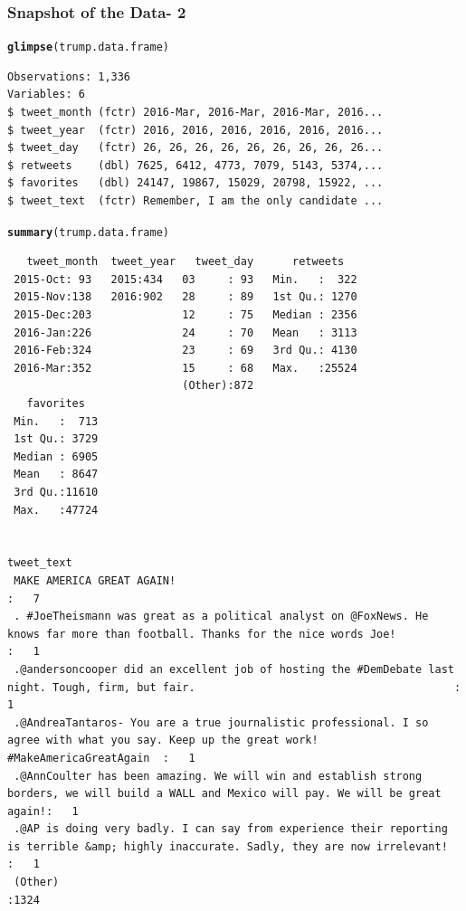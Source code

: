 \documentclass{beamer}\usepackage[]{graphicx}\usepackage[]{color}
\makeatletter
\newcommand{\hlstd}[1]{\textcolor[rgb]{0.102,0.102,0.102}{#1}}%
\newcommand{\hlkwd}[1]{\textcolor[rgb]{0.102,0.102,0.102}{\textbf{#1}}}%
\newenvironment{kframe}{%
 \def\at@end@of@kframe{}%
 \ifinner\ifhmode%
  \def\at@end@of@kframe{\end{minipage}}%
  \begin{minipage}{\columnwidth}%
 \fi\fi%
 \def\FrameCommand##1{\hskip\@totalleftmargin \hskip-\fboxsep
 \colorbox{shadecolor}{##1}\hskip-\fboxsep
     \hskip-\linewidth \hskip-\@totalleftmargin \hskip\columnwidth}%
 \MakeFramed {\advance\hsize-\width
   \@totalleftmargin\z@ \linewidth\hsize
   \@setminipage}}%
 {\par\unskip\endMakeFramed%
 \at@end@of@kframe}
\newenvironment{knitrout}{}{} %
\renewenvironment{knitrout}{\begin{spacing}{0.75}\begin{tiny}}{\end{tiny}\end{spacing}}
\makeatother
\begin{document}
\begin{frame}[fragile]
\frametitle{Snapshot of the Data- 2}

\begin{knitrout}\small
{}\color{fgcolor}\begin{kframe}
\begin{alltt}
\hlkwd{glimpse}\hlstd{(trump.data.frame)}
\end{alltt}
\begin{verbatim}
Observations: 1,336
Variables: 6
$ tweet_month (fctr) 2016-Mar, 2016-Mar, 2016-Mar, 2016...
$ tweet_year  (fctr) 2016, 2016, 2016, 2016, 2016, 2016...
$ tweet_day   (fctr) 26, 26, 26, 26, 26, 26, 26, 26, 26...
$ retweets    (dbl) 7625, 6412, 4773, 7079, 5143, 5374,...
$ favorites   (dbl) 24147, 19867, 15029, 20798, 15922, ...
$ tweet_text  (fctr) Remember, I am the only candidate ...
\end{verbatim}
\begin{alltt}
\hlkwd{summary}\hlstd{(trump.data.frame)}
\end{alltt}
\begin{verbatim}
   tweet_month  tweet_year   tweet_day      retweets    
 2015-Oct: 93   2015:434   03     : 93   Min.   :  322  
 2015-Nov:138   2016:902   28     : 89   1st Qu.: 1270  
 2015-Dec:203              12     : 75   Median : 2356  
 2016-Jan:226              24     : 70   Mean   : 3113  
 2016-Feb:324              23     : 69   3rd Qu.: 4130  
 2016-Mar:352              15     : 68   Max.   :25524  
                           (Other):872                  
   favorites    
 Min.   :  713  
 1st Qu.: 3729  
 Median : 6905  
 Mean   : 8647  
 3rd Qu.:11610  
 Max.   :47724  
                
                                                                                                                                      tweet_text  
 MAKE AMERICA GREAT AGAIN!                                                                                                                 :   7  
 . #JoeTheismann was great as a political analyst on @FoxNews. He knows far more than football. Thanks for the nice words Joe!             :   1  
 .@andersoncooper did an excellent job of hosting the #DemDebate last night. Tough, firm, but fair.                                        :   1  
 .@AndreaTantaros- You are a true journalistic professional. I so agree with what you say. Keep up the great work! #MakeAmericaGreatAgain  :   1  
 .@AnnCoulter has been amazing. We will win and establish strong borders, we will build a WALL and Mexico will pay. We will be great again!:   1  
 .@AP is doing very badly. I can say from experience their reporting is terrible &amp; highly inaccurate. Sadly, they are now irrelevant!  :   1  
 (Other)                                                                                                                                   :1324  
\end{verbatim}
\end{kframe}
\end{knitrout}

\end{frame}
\end{document}
